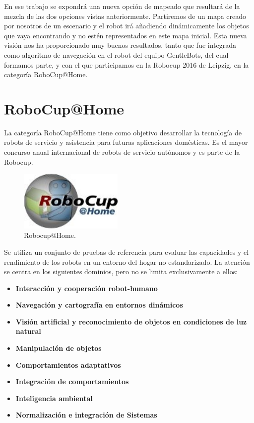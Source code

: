 En ese trabajo se expondrá una nueva opción de mapeado que resultará de la mezcla de las dos opciones vistas anteriormente. Partiremos de un mapa creado por nosotros de un escenario y el robot irá añadiendo dinámicamente los objetos que vaya encontrando y no estén representados en este mapa inicial. Esta nueva visión nos ha proporcionado muy buenos resultados, tanto que fue integrada como algoritmo de navegación en el robot del equipo GentleBots, del cual formamos parte, y con el que participamos en la Robocup 2016 de Leipzig, en la categoría RoboCup@Home.

\section{RoboCup@Home}
\label{cap:robocup}
La categoría RoboCup@Home tiene como objetivo desarrollar la tecnología de robots de servicio y asistencia para futuras aplicaciones domésticas. Es el mayor concurso anual internacional de robots de servicio autónomos y es parte de la Robocup.

\begin{figure} [hbtp]
  \begin{center}
    \includegraphics[width=5cm]{img/cap1/logoRobocupHome}
  \end{center}
  \caption{Robocup@Home.}
  \label{fig:logoRobocupHome}
\end{figure}

Se utiliza un conjunto de pruebas de referencia  para evaluar las capacidades y el rendimiento de los robots en un entorno del hogar no estandarizado. La atención se centra en los siguientes dominios, pero no se limita exclusivamente a ellos:

\begin{itemize}
\item \textbf{Interacción y cooperación robot-humano} 
\item \textbf{Navegación y cartografía en entornos dinámicos} 
\item \textbf{Visión artificial y reconocimiento de objetos en condiciones de luz natural} 
\item \textbf{Manipulación de objetos} 
\item \textbf{Comportamientos adaptativos} 
\item \textbf{Integración de comportamientos}
\item \textbf{Inteligencia ambiental}  
\item \textbf{Normalización e integración de Sistemas}  
\end{itemize}

